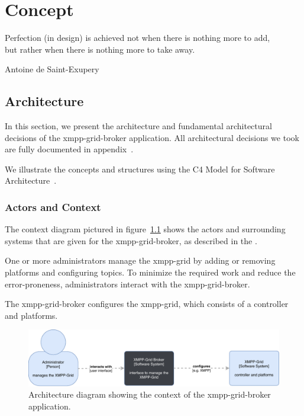 \chapter{Concept} %
\epigraph{Perfection (in design) is achieved not when there is nothing more to add,\\but rather when there is nothing more to take away.}{Antoine de Saint-Exupery}

\section{Architecture}\label{sec:architecture}

In this section, we present the architecture and fundamental architectural decisions of the \gls{xmpp-grid-broker} application.
All architectural decisions we took are fully documented in appendix~.

We illustrate the concepts and structures using the C4 Model for Software Architecture~\cite{c4-model}.

\subsection{Actors and Context}

The context diagram pictured in figure~\ref{fig:architecturecontext} shows the actors and surrounding systems that are given for the \gls{xmpp-grid-broker}, as described in the .

One or more administrators manage the \gls{xmpp-grid} by adding or removing \glspl{platform} and configuring \glspl{topic}.
To minimize the required work and reduce the error-proneness, administrators interact with the \gls{xmpp-grid-broker}.

The \gls{xmpp-grid-broker} configures the \gls{xmpp-grid}, which consists of a \gls{controller} and \glspl{platform}.

\begin{figure}[h]
\centering
\includegraphics[width=\linewidth]{resources/architecture_context}
\caption[Architecture context diagram]{Architecture diagram showing the context of the \gls{xmpp-grid-broker} application.}
\label{fig:architecturecontext}
\end{figure}



